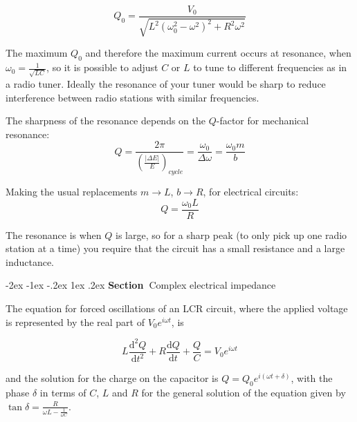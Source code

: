 \documentclass[
]{book}
\makeatletter
\renewcommand\section{%
\@startsection{section}{1}{\z@}%
              {-2ex \@plus -1ex \@minus -.2ex}%
              {1ex \@plus .2ex}%
              {\sffamily\bfseries\large\noindent Section~}}
\numberwithin{equation}{section}
\makeatother
\begin{document}
\begin{equation}
\label{eq:Q0}
Q_0 = \frac{V_0}{\sqrt{ L^2 (\omega_0^2 - \omega^2)^2 + R^2 \omega^2 }}
\end{equation}

The maximum \(Q_0\) and therefore the maximum current occurs at resonance,
when \(\omega_0 = \frac{1}{\sqrt{LC}}\), so it is possible to adjust \(C\)
or \(L\) to tune to different frequencies as in a radio tuner. Ideally the
resonance of your tuner would be sharp to reduce interference between
radio stations with similar frequencies.

The sharpness of the resonance depends on the \(Q\)-factor for mechanical
resonance:
\begin{equation}
\label{eq:Qfactor}
Q = \frac{2\pi}{ \left( \frac{|\Delta E|}{E} \right)_{cycle} } = \frac{\omega_0}{\Delta \omega} = \frac{\omega_0 m}{b}
\end{equation}

Making the usual replacements \(m \rightarrow L\), \(b \rightarrow R\), for
electrical circuits:
\begin{equation}
\label{eq:QvsOmega}
Q = \frac{\omega_0 L}{R}
\end{equation}

The resonance is when \(Q\) is large, so for a sharp peak (to only pick up
one radio station at a time) you require that the circuit has a small
resistance and a large inductance.

\hypertarget{complex-electrical-impedance}{%
\section{Complex electrical impedance}\label{complex-electrical-impedance}}

The equation for forced oscillations of an LCR circuit, where the
applied voltage is represented by the real part of \(V_0 e^{i\omega t}\),
is

\begin{equation}
\label{eq:forcedOsc}
L \frac{ \mathrm{d}^2 Q}{\mathrm{d} t^2} + R \frac{\mathrm{d} Q}{\mathrm{d} t} + \frac{Q}{C} = V_0 e^{i\omega t}
\end{equation}

and the solution for the charge on the capacitor is
\(Q = Q_0 e^{ i(\omega t + \delta)}\), with the phase \(\delta\) in terms
of \(C\), \(L\) and \(R\) for the general solution of the equation given by
\(\tan \delta = \frac{R}{ \omega L - \frac{1}{\omega C} }\).
\end{document}
